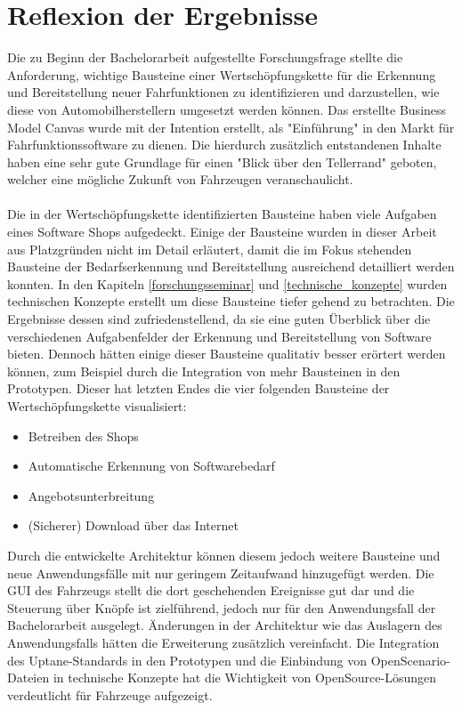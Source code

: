\section{Reflexion der Ergebnisse}
Die zu Beginn der Bachelorarbeit aufgestellte Forschungsfrage stellte die Anforderung, wichtige Bausteine einer Wertschöpfungskette für die Erkennung und Bereitstellung neuer Fahrfunktionen zu identifizieren und darzustellen, wie diese von Automobilherstellern umgesetzt werden können. Das erstellte Business Model Canvas wurde mit der Intention erstellt, als "Einführung" in den Markt für Fahrfunktionssoftware zu dienen. Die hierdurch zusätzlich entstandenen Inhalte haben eine sehr gute Grundlage für einen "Blick über den Tellerrand" geboten, welcher eine mögliche Zukunft von Fahrzeugen veranschaulicht.\\\\
Die in der Wertschöpfungskette identifizierten Bausteine haben viele Aufgaben eines Software Shops aufgedeckt. Einige der Bausteine wurden in dieser Arbeit aus Platzgründen nicht im Detail erläutert, damit die im Fokus stehenden Bausteine der Bedarfserkennung und Bereitstellung ausreichend detailliert werden konnten. In den Kapiteln \ref{forschungsseminar} und \ref{technische_konzepte} wurden technischen Konzepte erstellt um diese Bausteine tiefer gehend zu betrachten. Die Ergebnisse dessen sind zufriedenstellend, da sie eine guten Überblick über die verschiedenen Aufgabenfelder der Erkennung und Bereitstellung von Software bieten. Dennoch hätten einige dieser Bausteine qualitativ besser erörtert werden können, zum Beispiel durch die Integration von mehr Bausteinen in den Prototypen. Dieser hat letzten Endes die vier folgenden Bausteine der Wertschöpfungskette visualisiert:
\begin{itemize}
	\item Betreiben des Shops
	\item Automatische Erkennung von Softwarebedarf
	\item Angebotsunterbreitung
	\item (Sicherer) Download über das Internet
\end{itemize}

Durch die entwickelte Architektur können diesem jedoch weitere Bausteine und neue Anwendungsfälle mit nur geringem Zeitaufwand hinzugefügt werden. Die GUI des Fahrzeugs stellt die dort geschehenden Ereignisse gut dar und die Steuerung über Knöpfe ist zielführend, jedoch nur für den Anwendungsfall der Bachelorarbeit ausgelegt. Änderungen in der Architektur wie das Auslagern des Anwendungsfalls hätten die Erweiterung zusätzlich vereinfacht. Die Integration des Uptane-Standards in den Prototypen und die Einbindung von OpenScenario-Dateien in technische Konzepte hat die Wichtigkeit von OpenSource-Lösungen verdeutlicht für Fahrzeuge aufgezeigt.\\

